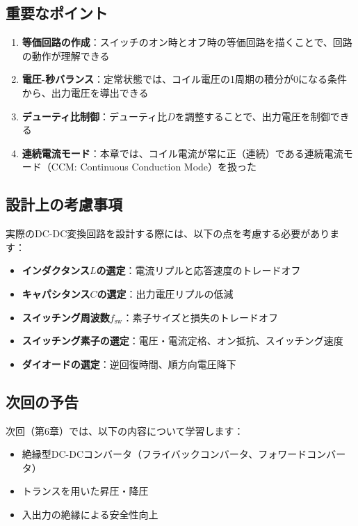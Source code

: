 \subsection{重要なポイント}

\begin{enumerate}
\item \textbf{等価回路の作成}：スイッチのオン時とオフ時の等価回路を描くことで、回路の動作が理解できる
\item \textbf{電圧-秒バランス}：定常状態では、コイル電圧の1周期の積分が0になる条件から、出力電圧を導出できる
\item \textbf{デューティ比制御}：デューティ比$D$を調整することで、出力電圧を制御できる
\item \textbf{連続電流モード}：本章では、コイル電流が常に正（連続）である連続電流モード（CCM: Continuous Conduction Mode）を扱った
\end{enumerate}

\subsection{設計上の考慮事項}

実際のDC-DC変換回路を設計する際には、以下の点を考慮する必要があります：

\begin{itemize}
\item \textbf{インダクタンス$L$の選定}：電流リプルと応答速度のトレードオフ
\item \textbf{キャパシタンス$C$の選定}：出力電圧リプルの低減
\item \textbf{スイッチング周波数$f_{\text{sw}}$}：素子サイズと損失のトレードオフ
\item \textbf{スイッチング素子の選定}：電圧・電流定格、オン抵抗、スイッチング速度
\item \textbf{ダイオードの選定}：逆回復時間、順方向電圧降下
\end{itemize}

\subsection{次回の予告}

次回（第6章）では、以下の内容について学習します：

\begin{itemize}
\item 絶縁型DC-DCコンバータ（フライバックコンバータ、フォワードコンバータ）
\item トランスを用いた昇圧・降圧
\item 入出力の絶縁による安全性向上
\end{itemize}
